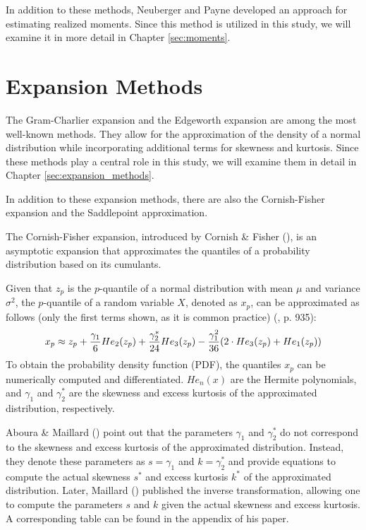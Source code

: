 In addition to these methods, Neuberger and Payne developed an approach for estimating realized moments. Since this method is utilized in this study, we will examine it in more detail in Chapter \ref{sec:moments}.

\section{Expansion Methods}

The Gram-Charlier expansion and the Edgeworth expansion are among the most well-known methods. They allow for the approximation of the density of a normal distribution while incorporating additional terms for skewness and kurtosis. Since these methods play a central role in this study, we will examine them in detail in Chapter \ref{sec:expansion_methods}.

In addition to these expansion methods, there are also the Cornish-Fisher expansion and the Saddlepoint approximation.

The Cornish-Fisher expansion, introduced by Cornish \& Fisher (\citeyear{cornishMomentsCumulantsSpecification1938}), is an asymptotic expansion that approximates the quantiles of a probability distribution based on its cumulants.

Given that $z_p$ is the $p$-quantile of a normal distribution with mean $\mu$ and variance $\sigma^2$, the $p$-quantile of a random variable $X$, denoted as $x_p$, can be approximated as follows (only the first terms shown, as it is common practice) (\cite{abramowitzHandbookMathematicalFunctions1968}, p. 935):
\begin{align}
    x_p \approx z_p + \frac{\gamma_1}{6}He_2(z_p) + \frac{\gamma_2^*}{24}He_3(z_p) - \frac{\gamma_1^2}{36}(2\cdot He_3(z_p) + He_1(z_p)) \notag
\end{align}
To obtain the probability density function (PDF), the quantiles $x_p$ can be numerically computed and differentiated. $He_n(x)$ are the Hermite polynomials, and $\gamma_1$ and $\gamma_2^*$ are the skewness and excess kurtosis of the approximated distribution, respectively.

Aboura \& Maillard (\citeyear{abouraOptionPricingSkewness2016}) point out that the parameters $\gamma_1$ and $\gamma_2^*$ do not correspond to the skewness and excess kurtosis of the approximated distribution. Instead, they denote these parameters as $s = \gamma_1$ and $k = \gamma_2^*$ and provide equations to compute the actual skewness $s^*$ and excess kurtosis $k^*$ of the approximated distribution. Later, Maillard (\citeyear{maillardUserGuideCornish2018}) published the inverse transformation, allowing one to compute the parameters $s$ and $k$ given the actual skewness and excess kurtosis. A corresponding table can be found in the appendix of his paper.

